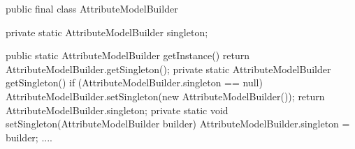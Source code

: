 \begin{spverbatim}
public final class AttributeModelBuilder {
	private static AttributeModelBuilder	singleton;

	public static AttributeModelBuilder getInstance() {
		return AttributeModelBuilder.getSingleton();
	}
	private static AttributeModelBuilder getSingleton() {
		if (AttributeModelBuilder.singleton == null) {
			AttributeModelBuilder.setSingleton(new AttributeModelBuilder());
		}
		return AttributeModelBuilder.singleton;
	}
		private static void setSingleton(AttributeModelBuilder builder) {
		AttributeModelBuilder.singleton = builder;
	}
....}
\end{spverbatim}